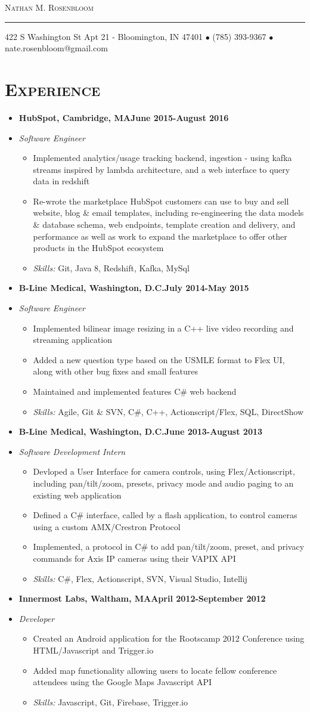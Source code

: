 \documentclass[10pt, oneside]{article}
\makeatletter
\newcommand{\lr}[2]{#1\hfill#2}
\newcommand{\name}{Nathan M. Rosenbloom}
\newcommand{\addr}{422 S Washington St Apt 21 - Bloomington, IN 47401}
\newcommand{\phone}{(785) 393-9367}
\newcommand{\email}{nate.rosenbloom@gmail.com}
\newcommand{\resname}[4]{
  \begin{center}
    \selectfont\LARGE\scshape #1
    \normalfont
    \footnotesize
    \itshape
    \rule{\textwidth}{1pt}
    #2 $\bullet$ #3 $\bullet$ #4
    \normalfont
  \end{center}
}
\newcommand{\skills}[1]{
\item[] \textsl{Skills:} #1
}
\newenvironment{ressection}[1]{
  \section{\normalsize \scshape \selectfont #1 \normalfont}
  \vspace{-4pt}
  \begin{itemize} \itemsep-2pt
  }{
  \end{itemize}
  \vspace{-20pt}
}
\newenvironment{resitem}[4]{
\item[] \lr{\bfseries \selectfont #1\normalfont, #2} {#3}
\item[] \textsl{#4}
  \vspace{-4pt}
  \begin{itemize} \itemsep-2pt
  }{
  \end{itemize}
}
\makeatother
\begin{document}
\resname{\name}{\addr}{\phone}{\email}
\setcounter{secnumdepth}{-1} %

\begin{ressection}{Experience}
  \begin{resitem}{HubSpot}{Cambridge, MA}{June 2015-August 2016}{Software Engineer}
  \item Implemented analytics/usage tracking backend, ingestion - using kafka streams inspired by lambda architecture, and a web interface to query data in redshift
  \item Re-wrote the marketplace HubSpot customers can use to buy and sell website, blog \& email templates, including re-engineering the data models \& database schema, web endpoints, template creation and delivery, and performance as well as work to expand the marketplace to offer other products in the HubSpot ecosystem
    \skills{Git, Java 8, Redshift, Kafka, MySql}
  \end{resitem}
  \begin {resitem}{B-Line Medical}{Washington, D.C.}{July 2014-May 2015}{Software Engineer} 
  \item Implemented bilinear image resizing in a C++ live video recording and streaming application
  \item Added a new question type based on the USMLE format to Flex UI, along with other bug fixes and small features
  \item Maintained and implemented features  C\# web backend
    \skills{Agile, Git \& SVN, C\#, C++, Actionscript/Flex, SQL, DirectShow}
  \end{resitem}
  \begin{resitem}{B-Line Medical}{Washington, D.C.}{June 2013-August 2013}{Software Development Intern}
  \item Devloped a User Interface for camera controls, using Flex/Actionscript, including pan/tilt/zoom, presets, privacy mode and audio paging to an existing web application
  \item Defined a C\# interface, called by a flash application, to control cameras using a custom AMX/Crestron Protocol
  \item Implemented, a protocol in C\# to add pan/tilt/zoom, preset, and privacy commands for Axis IP cameras using their VAPIX API
    \skills{C\#, Flex, Actionscript, SVN, Visual Studio, Intellij}
  \end{resitem}
  \begin{resitem}{Innermost Labs}{Waltham, MA}{April 2012-September 2012}{Developer}
  \item Created an Android application for the Rootscamp 2012 Conference using HTML/Javascript and Trigger.io
  \item Added map functionality allowing users to locate fellow conference attendees  using the Google Maps Javascript API
    \skills{Javascript, Git, Firebase, Trigger.io}
  \end{resitem}
\end{ressection}
\end{document}
